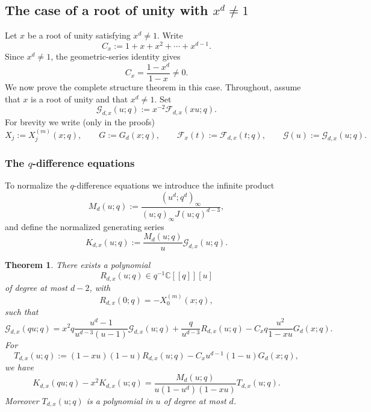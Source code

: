 \documentclass[12pt]{amsart}
\numberwithin{equation}{section}
\newtheorem{theorem}{Theorem}[section]
\newcommand{\CC}{\mathbb C}
\begin{document}
\subsection[The case of a root of unity with x to the d not equal to 1]{The case of a root of unity with \texorpdfstring{$x^d\neq 1$}{x to the d not equal to 1}}\label{sec:rootofunitynot1}

Let $x$ be a root of unity satisfying $x^d\neq 1$.  Write
\[
C_x:=1+x+x^2+\cdots+x^{d-1}.
\]
Since $x^d\neq 1$, the geometric-series identity gives
\[
C_x=\frac{1-x^d}{1-x}\neq 0.
\]
We now prove the complete structure theorem in this case. 
Throughout, assume that $x$ is a root of unity and that $x^d\neq 1$.  Set
\[
\mathcal G_{d,x}(u;q):=x^{-2}\mathcal F_{d,x}(xu;q).
\]
For brevity we write (only in the proofs)
\[
X_j:=X_j^{(m)}(x;q),
\qquad
G:=G_d(x;q),
\qquad
\mathcal F_x(t):=\mathcal F_{d,x}(t;q),
\qquad
\mathcal G(u):=\mathcal G_{d,x}(u;q).
\]

\subsubsection{The $q$-difference equations}
To normalize the $q$-difference equations we introduce the infinite product
\[
M_d(u;q):=\frac{(u^d;q^d)_\infty}{(u;q)_\infty J(u;q)^{d-3}},
\]
and define the normalized generating series
\[
K_{d,x}(u;q):=\frac{M_d(u;q)}{u}\mathcal G_{d,x}(u;q).
\]

\begin{theorem}\label{thm:general-root:iplusii}
There exists a polynomial
\[
R_{d,x}(u;q)\in q^{-1}\CC[[q]][u]
\]
of degree at most $d-2$, with
\[
R_{d,x}(0;q)=-X_0^{(m)}(x;q),
\]
such that
\begin{equation}\label{eq:main-functional-general}
\mathcal G_{d,x}(qu;q)
=
x^2 q\frac{u^d-1}{u^{d-3}(u-1)}\mathcal G_{d,x}(u;q)
+
\frac{q}{u^{d-3}}R_{d,x}(u;q)
-
C_x q\frac{u^2}{1-xu}G_d(x;q).
\end{equation}
For
\begin{equation}\label{eq:def-T-general}
T_{d,x}(u;q):=(1-xu)(1-u)R_{d,x}(u;q)-C_xu^{d-1}(1-u)G_d(x;q),
\end{equation}
we have
\begin{equation}\label{eq:defect-general}
K_{d,x}(qu;q)-x^2K_{d,x}(u;q)
=
\frac{M_d(u;q)}{u(1-u^d)(1-xu)}T_{d,x}(u;q).
\end{equation}
Moreover $T_{d,x}(u;q)$ is a polynomial in $u$ of degree at most $d$.
\end{theorem}
\end{document}

